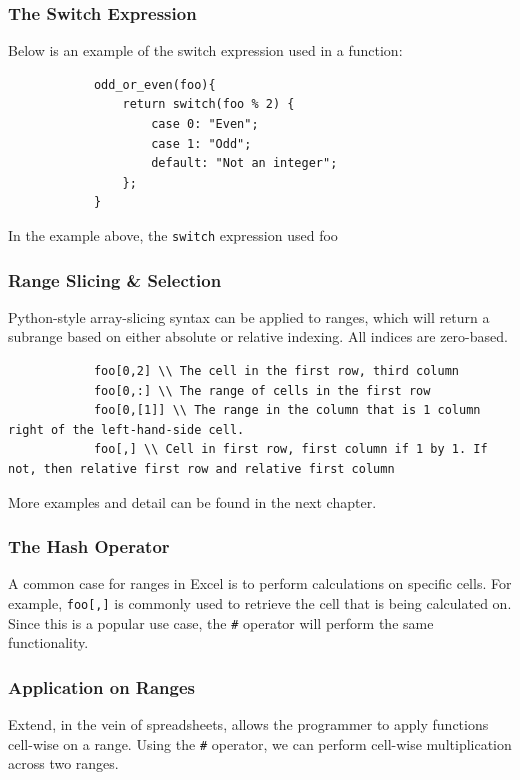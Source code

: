 		\subsubsection{The Switch Expression}
		Below is an example of the switch expression used in a function:

		\begin{lstlisting}
			odd_or_even(foo){
				return switch(foo % 2) {
					case 0: "Even";
					case 1: "Odd";
					default: "Not an integer";
				};
			}
		\end{lstlisting}

	\medskip \noindent
	In the example above, the \texttt{switch} expression used foo %

		\subsubsection{Range Slicing \& Selection}
		Python-style array-slicing syntax can be applied to ranges, which will return a subrange based on either absolute or relative indexing. All indices are zero-based.

		\begin{lstlisting}
			foo[0,2] \\ The cell in the first row, third column
			foo[0,:] \\ The range of cells in the first row
			foo[0,[1]] \\ The range in the column that is 1 column right of the left-hand-side cell.
			foo[,] \\ Cell in first row, first column if 1 by 1. If not, then relative first row and relative first column
		\end{lstlisting}

		\medskip \noindent
		More examples and detail can be found in the next chapter.

		\subsubsection{The Hash Operator}
		A common case for ranges in Excel is to perform calculations on specific cells. For example, \texttt{foo[,]} is commonly used to retrieve the cell that is being calculated on.
		Since this is a popular use case, the \texttt{\#} operator will perform the same functionality.

		\subsubsection{Application on Ranges}
		Extend, in the vein of spreadsheets, allows the programmer to apply functions cell-wise on a range. Using the \texttt{\#} operator, we can perform cell-wise multiplication across two ranges.

